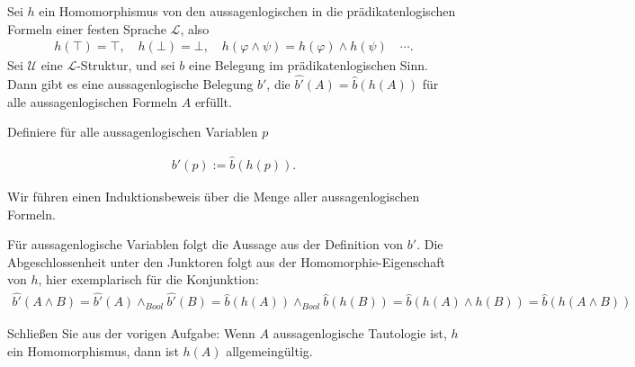 
\begin{exercise}[83]

Sei $h$ ein Homomorphismus von den aussagenlogischen in die prädikatenlogischen
Formeln einer festen Sprache $\mathscr{L}$, also
\begin{align*}
  h(\top) = \top, \quad h(\bot) = \bot, \quad h(\varphi \land \psi) =
  h(\varphi) \land h(\psi) \quad \cdots.
\end{align*}
Sei $\mathscr{U}$ eine $\mathscr{L}$-Struktur, und sei $b$ eine Belegung
im prädikatenlogischen Sinn. \\
Dann gibt es eine aussagenlogische Belegung $b'$, die
$\hat{b'}(A) = \hat{b}(h(A))$ für alle aussagenlogischen Formeln $A$ erfüllt.
\end{exercise}


\begin{solution}

Definiere für alle aussagenlogischen Variablen $p$

\begin{align*}
  b'(p) := \hat{b}(h(p)).
\end{align*}

Wir führen einen Induktionsbeweis über die Menge aller aussagenlogischen Formeln.

Für aussagenlogische Variablen folgt die Aussage aus der Definition von $b'$.
Die Abgeschlossenheit unter den Junktoren folgt aus der Homomorphie-Eigenschaft von $h$, hier exemplarisch für die Konjunktion:
\begin{align*}
  \hat{b'}(A \land B) = \hat{b'}(A) \land_{Bool} \hat{b'}(B)
  = \hat{b}(h(A)) \land_{Bool} \hat{b}(h(B)) = \hat{b}(h(A) \land h(B))
  = \hat{b}(h(A \land B))
\end{align*}

\end{solution}



\begin{exercise}[84]

Schließen Sie aus der vorigen Aufgabe: Wenn $A$ aussagenlogische Tautologie ist,
$h$ ein Homomorphismus, dann ist $h(A)$ allgemeingültig.
\end{exercise}

